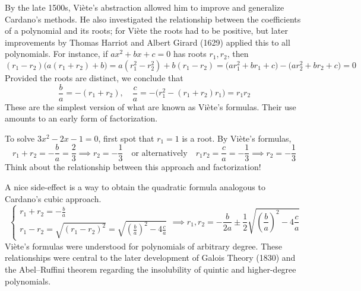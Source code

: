 
By the late 1500s, Viète's abstraction allowed him to improve and generalize Cardano's methods. He also investigated the relationship between the coefficients of a polynomial and its roots; for Viète the roots had to be positive, but later improvements by Thomas Harriot and Albert Girard (1629) applied this to all polynomials. For instance, if $ax^2+bx+c=0$ has roots $r_1,r_2$, then
\[(r_1-r_2)\bigl(a(r_1+r_2)+b\bigr)=a(r_1^2-r_2^2)+b(r_1-r_2)=
\bigl(ar_1^2+br_1+c\bigr)-\bigl(ar_2^2+br_2+c\bigr)=0\]
Provided the roots are distinct, we conclude that
\[\frac ba=-(r_1+r_2),\quad \frac ca=-\bigl(r_1^2-(r_1+r_2)r_1\bigr)=r_1r_2\]
These are the simplest version of what are known as Viète's formulas. Their use amounts to an early form of factorization.


To solve $3x^2-2x-1=0$, first spot that $r_1=1$ is a root. By Viète's formulas,
\[r_1+r_2=-\frac ba=\frac 23\implies r_2=-\frac 13\quad\text{or alternatively}\quad r_1r_2=\frac ca=-\frac 13\implies r_2=-\frac 13\]
Think about the relationship between this approach and factorization!\medbreak

A nice side-effect is a way to obtain the quadratic formula analogous to Cardano's cubic approach.
\[\begin{cases}
r_1+r_2=-\frac ba\\
r_1-r_2=\sqrt{(r_1-r_2)^2}=\sqrt{\left(\frac ba\right)^2-4\frac ca}
\end{cases}
\implies r_1,r_2=-\frac b{2a}\pm\frac 12\sqrt{\left(\frac ba\right)^2-4\frac ca}\]
Viète's formulas were understood for polynomials of arbitrary degree. These relationships were central to the later development of Galois Theory (1830) and the Abel--Ruffini theorem regarding the insolubility of quintic and higher-degree polynomials.\medskip
% 
% 

